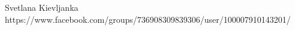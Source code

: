  
 
 
 
 
Svetlana Kievljanka
https://www.facebook.com/groups/736908309839306/user/100007910143201/
